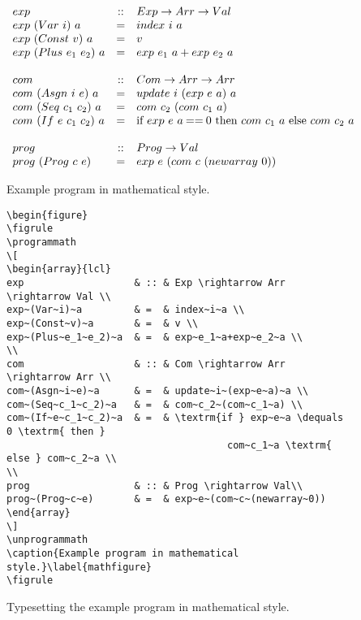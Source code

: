 \documentclass{jfp1}
\begin{document}
\begin{figure}
\figrule
\programmath
\[
\begin{array}{lcl}
exp                   & :: & Exp \rightarrow Arr \rightarrow Val \\
exp~(Var~i)~a         & =  & index~i~a \\
exp~(Const~v)~a       & =  & v \\
exp~(Plus~e_1~e_2)~a  & =  & exp~e_1~a+exp~e_2~a \\
\\
com                   & :: & Com \rightarrow Arr \rightarrow Arr \\
com~(Asgn~i~e)~a      & =  & update~i~(exp~e~a)~a \\
com~(Seq~c_1~c_2)~a   & =  & com~c_2~(com~c_1~a) \\
com~(If~e~c_1~c_2)~a  & =  & \textrm{if } exp~e~a \mathbin{==} 0 \textrm{ then }
                                      com~c_1~a \textrm{ else } com~c_2~a \\
\\
prog                  & :: & Prog \rightarrow Val\\
prog~(Prog~c~e)       & =  & exp~e~(com~c~(newarray~0))
\end{array}
\]
\unprogrammath
\caption{Example program in mathematical style.}\label{mathfigure}
\figrule
\begin{center}
\begin{verbatim}
\begin{figure}
\figrule
\programmath
\[
\begin{array}{lcl}
exp                   & :: & Exp \rightarrow Arr \rightarrow Val \\
exp~(Var~i)~a         & =  & index~i~a \\
exp~(Const~v)~a       & =  & v \\
exp~(Plus~e_1~e_2)~a  & =  & exp~e_1~a+exp~e_2~a \\
\\
com                   & :: & Com \rightarrow Arr \rightarrow Arr \\
com~(Asgn~i~e)~a      & =  & update~i~(exp~e~a)~a \\
com~(Seq~c_1~c_2)~a   & =  & com~c_2~(com~c_1~a) \\
com~(If~e~c_1~c_2)~a  & =  & \textrm{if } exp~e~a \dequals 0 \textrm{ then }
                                      com~c_1~a \textrm{ else } com~c_2~a \\
\\
prog                  & :: & Prog \rightarrow Val\\
prog~(Prog~c~e)       & =  & exp~e~(com~c~(newarray~0))
\end{array}
\]
\unprogrammath
\caption{Example program in mathematical style.}\label{mathfigure}
\figrule
\end{verbatim}
\end{center}
\caption{Typesetting the example program in mathematical style.}\label{mathtypeset}
\figrule
\end{figure}
\end{document}
